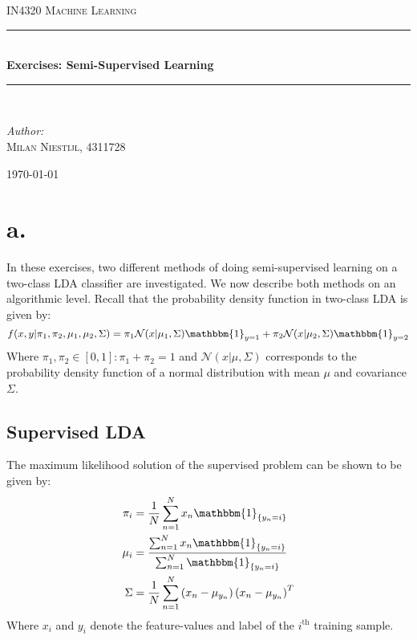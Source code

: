 \documentclass [a4paper] {report}
\begin{document}
	
	\begin{titlepage}
		\begin{center}
			
			\textsc{\LARGE IN4320 Machine Learning}\\[1.25cm]
			
			\rule{\linewidth}{0.5mm}\\[1.0cm]
			{\huge \bfseries Exercises: Semi-Supervised Learning }\\[0.6cm]
			\rule{\linewidth}{0.5mm}\\[1.5cm]
			
			\begin{minipage}{0.4\textwidth}
				\begin{flushleft} \large	
					\emph{Author:}\\
					\textsc{Milan Niestijl, 4311728}
				\end{flushleft}
			\end{minipage}
			
			\vfill
			{\large \today}
		\end{center}
	\end{titlepage}
	
	\section*{a.}
	In these exercises, two different methods of doing semi-supervised learning on a two-class LDA classifier are investigated. We now describe both methods on an algorithmic level. Recall that the probability density function in two-class LDA is given by:
	$$ f(x,y| \pi_{1}, \pi_{2}, \mu_{1},\mu_{2}, \Sigma) = \pi_{1}\mathcal{N}(x|\mu_{1}, \Sigma)\mathbbm{1}_{y=1} + \pi_{2}\mathcal{N}(x|\mu_{2}, \Sigma)\mathbbm{1}_{y=2}$$
	Where $\pi_{1}, \pi_{2} \in [0,1]: \pi_{1} + \pi_{2} =1$ and $\mathcal{N}(x|\mu, \Sigma)$ corresponds to the probability density function of a normal distribution with mean $\mu$ and covariance $\Sigma$.
	\subsection*{Supervised LDA}
	The maximum likelihood solution of the supervised problem can be shown to be given by:
	\begin{align*}
		\pi_{i} &= {1 \over N} \sum_{n=1}^{N}x_{n}\mathbbm{1}_{\{y_{n}=i\}}\\ 
		\mu_{i} &= \frac{\sum_{n=1}^{N}x_{n}\mathbbm{1}_{\{y_{n}=i\}}}{\sum_{n=1}^{N}\mathbbm{1}_{\{y_{n}=i\}}}\\
		\Sigma &= {1 \over N} \sum_{n=1}^{N} \left( x_{n} - \mu_{y_{n}} \right)\left( x_{n} - \mu_{y_{n}} \right)^{T}
	\end{align*}
	Where $x_{i}$ and $y_{i}$ denote the feature-values and label of the $i^{\text{th}}$ training sample.
\end{document}
